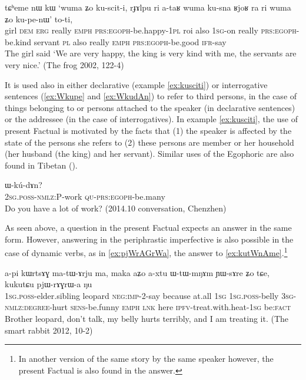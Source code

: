 \documentclass[oldfontcommands,oneside,a4paper,11pt]{article}
\newcommand{\ipa}[1]{{\phon \mbox{#1}}} %
\newcommand{\factual}[1]{\textsc{:fact}}
\begin{document}
 
\begin{exe}
\ex \label{ex:kusciti}
\gll
\ipa{tɕʰeme} 	\ipa{nɯ} 	\ipa{kɯ} 	\ipa{`wuma} 	\ipa{ʑo} 	\ipa{ku-scit-i,} \ipa{rɟɤlpu} 	\ipa{ri} 	\ipa{a-taʁ} 	\ipa{wuma} 	\ipa{ku-sna} \ipa{ʁjoʁ} 	\ipa{ra} 	\ipa{ri} 	\ipa{wuma} 	\ipa{ʑo} 	\ipa{ku-pe-nɯ'} \ipa{to-ti,} \\
girl \textsc{dem} \textsc{erg} really \textsc{emph} \textsc{prs:egoph}-be.happy-\textsc{1pl}  roi also \textsc{1sg}-on really \textsc{prs:egoph}-be.kind servant \textsc{pl} also really \textsc{emph}   \textsc{prs:egoph}-be.good \textsc{ifr}-say \\
\glt The girl said `We are very happy, the king is very kind with me, the servants are very nice.'
(The frog 2002, 122-4)
\end{exe}

It is used also in either declarative (example \ref{ex:kusciti}) or  interrogative sentences (\ref{ex:Wkupe} and \ref{ex:WkudAn}) to refer to third persons, in the case of things belonging to or persons attached to the speaker (in declarative sentences) or the addressee (in the case of interrogatives). In example \ref{ex:kusciti}, the  use of present Factual is motivated by the facts that (1) the speaker is affected by the state of the persons she refers to (2) these persons are member or her household (her husband (the king) and her servant). Similar uses of the Egophoric are also found in Tibetan (\citealt[297]{tournadre08conjunct}).

 
  \begin{exe}
\ex \label{ex:WkudAn}
\gll \ipa{nɤ-kɤ-nɤma} 	\ipa{ɯ-kú-dɤn?}  \\
 \textsc{2sg.poss-nmlz:P}-work \textsc{qu-prs:egoph}-be.many \\
\glt Do you have a lot of work? (2014.10 conversation, Chenzhen)
\end{exe}

As seen above, a question in the present Factual expects an answer in the same form. However, answering in the periphrastic imperfective is also possible in the case of dynamic verbs, as in \ref{ex:pjWrAGrWa}, the answer to \ref{ex:kutWnAme}.\footnote{In another version of the same story by the same speaker however, the present Factual is also found in the answer.}

 \begin{exe}
\ex \label{ex:pjWrAGrWa}
\gll
 \ipa{a-pi} 	\ipa{kɯrtsɤɣ} 	\ipa{ma-tɯ-ɤrju} 	\ipa{ma,} 	\ipa{maka} 	\ipa{aʑo} 	\ipa{a-xtu} 	\ipa{ɯ-tɯ-mŋɤm} 	\ipa{ɲɯ-sɤre} 	\ipa{ʑo} 	\ipa{tɕe,} 	\ipa{kukutɕu} 	\ipa{pjɯ-rɤɣrɯ-a} 	\ipa{ŋu} 	\\
 \textsc{1sg.poss}-elder.sibling leopard \textsc{neg:imp}-2-say because at.all \textsc{1sg} \textsc{1sg.poss}-belly \textsc{3sg-nmlz:degree}-hurt \textsc{sens}-be.funny \textsc{emph} \textsc{lnk} here \textsc{ipfv}-treat.with.heat-\textsc{1sg} be\factual{}  \\
\glt Brother leopard, don't talk, my belly hurts terribly, and I am treating it. (The smart rabbit 2012, 10-2)
 \end{exe}
 
\end{document}
